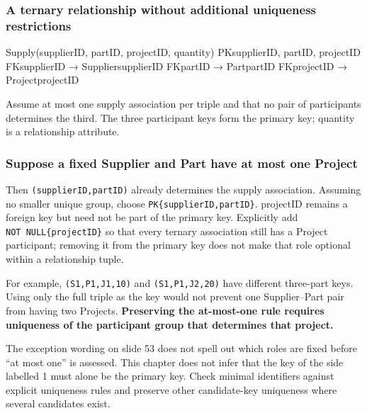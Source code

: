\subsubsection{A ternary relationship without additional uniqueness restrictions}\label{04_er_to_relational_mapping_en-a-ternary-relationship-without-additional-uniqueness-restrictions}

\begin{StudyCode}
Supply(supplierID, partID, projectID, quantity)
PK{supplierID, partID, projectID}
FK{supplierID} → Supplier{supplierID}
FK{partID} → Part{partID}
FK{projectID} → Project{projectID}
\end{StudyCode}

Assume at most one supply association per triple and that no pair of participants determines the third. The three participant keys form the primary key; quantity is a relationship attribute.

\subsubsection{Suppose a fixed Supplier and Part have at most one Project}\label{04_er_to_relational_mapping_en-suppose-a-fixed-supplier-and-part-have-at-most-one-project}

Then \texttt{(\allowbreak{}supplierID,\allowbreak{}partID)\allowbreak{}} already determines the supply association. Assuming no smaller unique group, choose \texttt{PK\{supplierID,partID\}}. projectID remains a foreign key but need not be part of the primary key. Explicitly add \texttt{NOT\ NULL\{projectID\}} so that every ternary association still has a Project participant; removing it from the primary key does not make that role optional within a relationship tuple.

For example, \texttt{(\allowbreak{}S1,\allowbreak{}P1,\allowbreak{}J1,\allowbreak{}10)\allowbreak{}} and \texttt{(\allowbreak{}S1,\allowbreak{}P1,\allowbreak{}J2,\allowbreak{}20)\allowbreak{}} have different three-part keys. Using only the full triple as the key would not prevent one Supplier--Part pair from having two Projects. \textbf{Preserving the at-most-one rule requires uniqueness of the participant group that determines that project.}

The exception wording on slide 53 does not spell out which roles are fixed before ``at most one'' is assessed. This chapter does not infer that the key of the side labelled 1 must alone be the primary key. Check minimal identifiers against explicit uniqueness rules and preserve other candidate-key uniqueness where several candidates exist.

